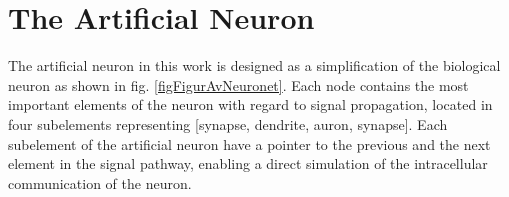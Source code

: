 

			

 		\section{The Artificial Neuron} %
			The artificial neuron in this work is designed as a simplification of the biological neuron as shown in fig. \ref{figFigurAvNeuronet}.
			Each node contains the most important elements of the neuron with regard to signal propagation, %
				located in four subelements representing [synapse, dendrite, auron, synapse].
			Each subelement of the artificial neuron have a pointer to the previous and the next element in the signal pathway, enabling a direct simulation of the intracellular communication of the neuron.
			

